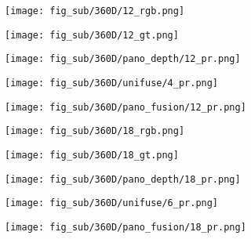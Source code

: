 \begin{figure*}[t]
	\centering
	\captionsetup[subfigure]{labelformat=empty}
	
	\begin{subfigure}{0.18\linewidth}
		\texttt{[image: fig\_sub/360D/12\_rgb.png]}
	\end{subfigure}
	\begin{subfigure}{0.18\linewidth}
		\texttt{[image: fig\_sub/360D/12\_gt.png]}
	\end{subfigure}
	\begin{subfigure}{0.18\linewidth}
		\texttt{[image: fig\_sub/360D/pano\_depth/12\_pr.png]}
	\end{subfigure}
	\begin{subfigure}{0.18\linewidth}
		\texttt{[image: fig\_sub/360D/unifuse/4\_pr.png]}
	\end{subfigure}
	\begin{subfigure}{0.18\linewidth}
		\texttt{[image: fig\_sub/360D/pano\_fusion/12\_pr.png]}
	\end{subfigure}

	\vspace{1pt}

	\begin{subfigure}{0.18\linewidth}
		\texttt{[image: fig\_sub/360D/18\_rgb.png]}
	\end{subfigure}
	\begin{subfigure}{0.18\linewidth}
		\texttt{[image: fig\_sub/360D/18\_gt.png]}
	\end{subfigure}
	\begin{subfigure}{0.18\linewidth}
		\texttt{[image: fig\_sub/360D/pano\_depth/18\_pr.png]}
	\end{subfigure}
	\begin{subfigure}{0.18\linewidth}
		\texttt{[image: fig\_sub/360D/unifuse/6\_pr.png]}
	\end{subfigure}
	\begin{subfigure}{0.18\linewidth}
		\texttt{[image: fig\_sub/360D/pano\_fusion/18\_pr.png]}
	\end{subfigure}
	
	\vspace{1pt}


\end{figure*}
